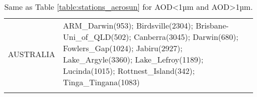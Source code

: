 \documentclass[journal abbreviation, manuscript]{copernicus}
\begin{document}
\begin{table}
\begin{tabularx}{\textwidth}{lX}
 AUSTRALIA &                                                                                                                                                                                                                                                                                                                                                                                                                                                                                                                                                                                                                                                                                                                                                                                                                                                                                                                                                                                                                                                                                                                                                                                                                                                                                                                                                                                                                                                                                                                                                                                                                                                                                                                                                                                                                                                                                                                                                                                                                                                                                                                                                                                ARM\_Darwin(953); Birdsville(2304); Brisbane-Uni\_of\_QLD(502); Canberra(3045); Darwin(680); Fowlers\_Gap(1024); Jabiru(2927); Lake\_Argyle(3360); Lake\_Lefroy(1189); Lucinda(1015); Rottnest\_Island(342); Tinga\_Tingana(1083) \\
\bottomhline
 \end{tabularx}
 \caption{Same as Table \ref{table:stations_aerosun} for AOD<1µm and AOD>1µm.}
 \label{table:stations_aerosda}
\end{table}
\end{document}
